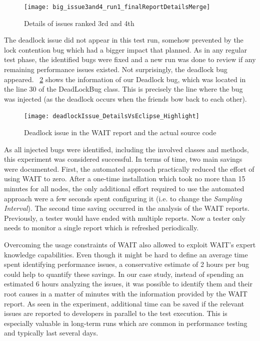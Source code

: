 \documentclass[runningheads,a4paper]{llncs}
\begin{document}
\begin{figure}[!h]
\centering
\texttt{[image: big\_issue3and4\_run1\_finalReportDetailsMerge]}
\caption{Details of issues ranked 3rd and 4th}
\label{fig_issues34}
\end{figure}

The deadlock issue did not appear in this test run, somehow prevented by the
lock contention bug which had a bigger impact that planned. As in any regular
test phase, the identified bugs were fixed and a new run was done to review
if any remaining performance issues existed. Not surprisingly, the deadlock bug
appeared. \figurename ~\ref{fig_dlissue_vs_code} shows the information of our
Deadlock bug, which was located in the line 30 of the DeadLockBug class. This is
precisely the line where the bug was injected (as the deadlock occurs when the
friends bow back to each other).
\begin{figure}[!h]
\centering
\texttt{[image: deadlockIssue\_DetailsVsEclipse\_Highlight]}
\caption{Deadlock issue in the WAIT report and the actual source code}
\label{fig_dlissue_vs_code}
\end{figure}

As all injected bugs were identified, including the involved classes and
methods, this experiment was considered successful. In terms of time, two main
savings were documented. First, the automated approach practically reduced the
effort of using WAIT to zero. After a one-time installation which took no more
than 15 minutes for all nodes, the only additional effort required to use the
automated approach were a few seconds spent configuring it (i.e. to change the
\emph{Sampling Interval}). The second time saving occurred in the analysis of the 
WAIT reports. Previously, a tester would have ended with multiple reports. Now a 
tester only needs to monitor a single report which is refreshed periodically.

Overcoming the usage constraints of WAIT also allowed to exploit
WAIT's expert knowledge capabilities. Even though it might be hard to define an
average time spent identifying performance issues, a conservative estimate of
2 hours per bug could help to quantify these savings. In our case study,
instead of spending an estimated 6 hours analyzing the issues, it was
possible to identify them and their root causes in a matter of minutes with the 
information provided by the WAIT report. As seen in the experiment, additional
time can be saved if the relevant issues are reported to developers in parallel to
the test execution. This is especially valuable in long-term runs which
are common in performance testing and typically last several days.
\end{document}
